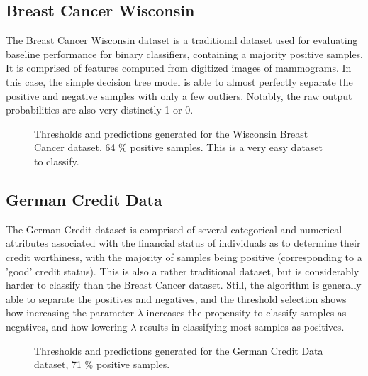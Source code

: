 \documentclass{article}
\begin{document}
\subsection{Breast Cancer Wisconsin}
The Breast Cancer Wisconsin dataset is a traditional dataset used for evaluating baseline performance for binary classifiers, containing a majority positive samples. It is comprised of features computed from digitized images of mammograms. In this case, the simple decision tree model is able to almost perfectly separate the positive and negative samples with only a few outliers. Notably, the raw output probabilities are also very distinctly 1 or 0.
\begin{figure}[H]
    \centering
    \scalebox{.8}{}
    \caption{Thresholds and predictions generated for the Wisconsin Breast Cancer dataset, 64 \% positive samples. This is a very easy dataset to classify.}
\end{figure}

\subsection{German Credit Data}
The German Credit dataset is comprised of several categorical and numerical attributes associated with the financial status of individuals as to determine their credit worthiness, with the majority of samples being positive (corresponding to a 'good' credit status). This is also a rather traditional dataset, but is considerably harder to classify than the Breast Cancer dataset. Still, the algorithm is generally able to separate the positives and negatives, and the threshold selection shows how increasing the parameter $\lambda$ increases the propensity to classify samples as negatives, and how lowering $\lambda$ results in classifying most samples as positives.
\begin{figure}[H]
    \centering
    \scalebox{.8}{}
    \caption{Thresholds and predictions generated for the German Credit Data dataset, 71 \% positive samples.}
\end{figure}
\end{document}
